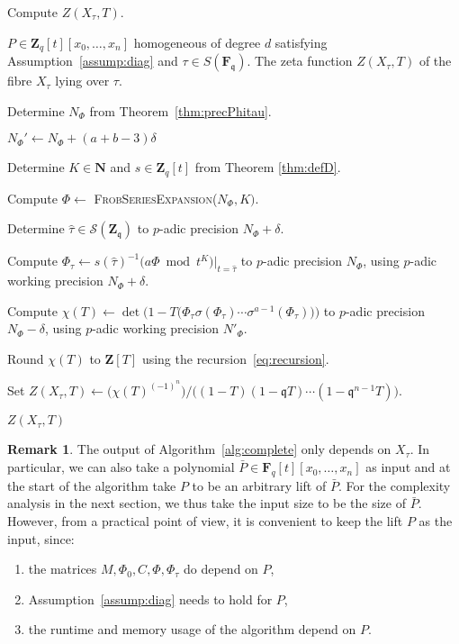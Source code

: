 \documentclass[a4paper,11pt]{article}
\numberwithin{equation}{section}
\newcommand{\NN}{\mathbf{N}} %
\newcommand{\ZZ}{\mathbf{Z}} %
\newcommand{\FF}{\mathbf{F}} %
\theoremstyle{definition}
\newtheorem{rem}[thm]{Remark}
\begin{document}
\begin{algorithm} 
\caption{Compute $Z(X_{\tau},T)$.}
\label{alg:complete}
\begin{algorithmic}
\vspace{1mm}
\Require $P \in \ZZ_q[t][x_0,\dotsc,x_n]$ homogeneous of degree $d$ satisfying Assumption~\ref{assump:diag} and $\tau \in S(\mathbf{F}_{\mathfrak{q}})$.
\Ensure  The zeta function $Z(X_{\tau},T)$ of the fibre $X_{\tau}$ lying over $\tau$.
\State \begin{compactenum}[{\hspace{1em} } 1.] \vspace{-1.24em}
\item Determine $N_{\Phi}$ from Theorem~\ref{thm:precPhitau}.
\item $N_{\Phi}' \gets N_{\Phi}+(a+b-3) \delta$
\item Determine $K \in \NN$ and $s \in \ZZ_q[t]$ from Theorem \ref{thm:defD}.
\item Compute $\Phi \gets$ \textsc{FrobSeriesExpansion($N_{\Phi},K)$}.
\item Determine $\hat{\tau} \in \mathcal{S}(\ZZ_{\mathfrak{q}})$ to $p$-adic precision $N_{\Phi}+\delta$.
\item Compute $\Phi_{\tau} \gets s(\hat{\tau})^{-1} \bigl( a \Phi \bmod{t^{K}} \bigr)|_{t=\hat{\tau}}$ 
      to $p$-adic precision $N_{\Phi}$, using $p$-adic working precision $N_{\Phi}+\delta$.
\item Compute $\chi(T) \gets \det\bigl(1-T \bigl(\Phi_{\tau} \sigma(\Phi_{\tau}) \dotsm \sigma^{a-1}(\Phi_{\tau}) \bigr)  \bigr)$ to $p$-adic precision $N_{\Phi}-\delta$, 
      using $p$-adic working precision $N'_{\Phi}$.
\item Round $\chi(T)$ to $\ZZ[T]$ using the recursion~\eqref{eq:recursion}. 
\item Set $Z(X_{\tau},T) \gets \bigl( \chi(T)^{(-1)^n} \bigr)/\bigl((1 - T) (1 - \mathfrak{q}T) \dotsm (1 - \mathfrak{q}^{n-1}T)\bigr)$.
\item \Return $Z(X_{\tau},T)$
\end{compactenum}
\EndProcedure
\end{algorithmic}
\end{algorithm}

\begin{rem}
The output of Algorithm~\ref{alg:complete} only depends on $X_{\tau}$.  
In particular, we can also take a polynomial 
$\bar{P} \in \FF_q[t][x_0,\dotsc,x_n]$ as input and at the start of 
the algorithm take $P$ to be an arbitrary lift of $\bar{P}$. For the 
complexity analysis in the next section, we thus take the input size 
to be the size of $\bar{P}$.  However, from a practical point of view, 
it is convenient to keep the lift $P$ as the input, since:
\begin{enumerate} 
\item the matrices $M, \Phi_0, C, \Phi, \Phi_{\tau}$ do depend on $P$,
\item Assumption~\ref{assump:diag} needs to hold for $P$,
\item the runtime and memory usage of the algorithm depend on $P$.
\end{enumerate}
\end{rem}
\end{document}
